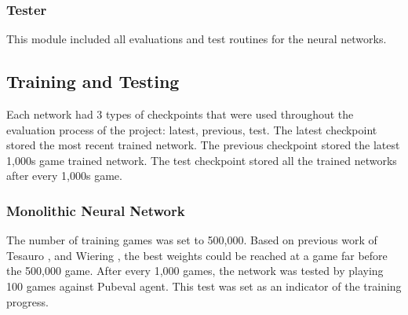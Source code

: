 \documentclass[12pt,a4paper]{article}
\begin{document}
\subsubsection{Tester}
This module included all evaluations and test routines for the neural networks. 

\subsection{Training and Testing}
Each network had 3 types of checkpoints that were used throughout the evaluation process of the project: latest, previous, test. The latest checkpoint stored the most recent trained network. The previous checkpoint stored the latest 1,000s game trained network. The test checkpoint stored all the trained networks after every 1,000s game. 

\subsubsection{Monolithic Neural Network}
The number of training games was set to 500,000. Based on previous work of Tesauro \citeyear{DBLP:journals/ai/Tesauro02}, and Wiering \citeyear{DBLP:journals/jilsa/Wiering10}, the best weights could be reached at a game far before the 500,000 game. After every 1,000 games, the network was tested by playing 100 games against Pubeval agent. This test was set as an indicator of the training progress.
\end{document}
